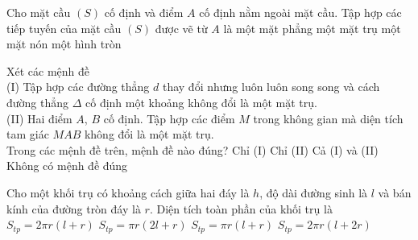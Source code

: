 \begin{ex}%
	Cho mặt cầu $(S)$ cố định và điểm $A$ cố định nằm ngoài mặt cầu. Tập hợp các tiếp tuyến của mặt cầu $(S)$ được vẽ từ $A$ là 
	\choice
	{một mặt phẳng}
	{một mặt trụ}
	{\True một mặt nón}
	{một hình tròn}
	\loigiai{}
\end{ex}
\begin{ex}%
	Xét các mệnh đề\\
	(I) Tập hợp các đường thẳng $d$ thay đổi nhưng luôn luôn song song và cách đường thẳng $\Delta $ cố định một khoảng không đổi là một mặt trụ.\\
	(II) Hai điểm $A$, $B$ cố định. Tập hợp các điểm $M$ trong không gian mà diện tích tam giác $MAB$ không đổi là một mặt trụ.\\
	Trong các mệnh đề trên, mệnh đề nào đúng?
	\choice
	{Chỉ (I)}
	{Chỉ (II)}
	{\True Cả (I) và (II)}
	{Không có mệnh đề đúng}
\end{ex}

\begin{ex}%
	Cho một khối trụ có khoảng cách giữa hai đáy là $ h $, độ dài đường sinh là $ l $ và bán kính của đường tròn đáy là $ r $. Diện tích toàn phần của khối trụ là
	\choice
	{\True  $S_{tp}=2\pi r(l+r)$}
	{ $S_{tp}=\pi r(2l+r)$}
	{$S_{tp}=\pi r(l+r)$}
	{$S_{tp}=2\pi r(l+2r)$}
\end{ex}

